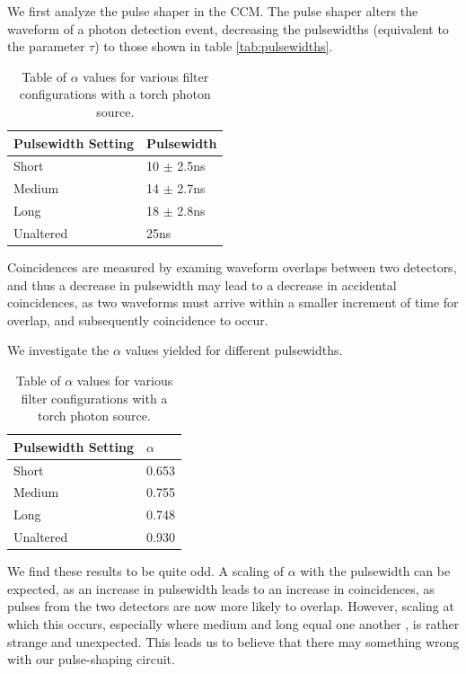 \documentclass[letterpaper, 11 pt]{article}
\begin{document}
We first analyze the pulse shaper in the CCM. The pulse shaper alters the waveform of a
photon detection event, decreasing the pulsewidths (equivalent to the parameter $\tau$) to those shown in table \ref{tab:pulsewidths}.
\begin{table}[H]
    \centering
    \begin{tabular}{|l|l|}
    \hline
    \textbf{Pulsewidth Setting} & \textbf{Pulsewidth} \\ \hline
    Short        & 10 $\pm$ 2.5ns                   \\ \hline
    Medium        & 14 $\pm$ 2.7ns                   \\ \hline
    Long        & 18 $\pm$ 2.8ns                   \\ \hline
    Unaltered                  & 25ns                   \\ \hline
    \end{tabular}
    \caption{Table of $\alpha$ values for various filter configurations with a torch photon source.}
\end{table}\label{tab:pulsewidths}
Coincidences are measured by examing waveform overlaps between two
detectors, and thus a decrease in pulsewidth may lead to a decrease in accidental coincidences,
as two waveforms must arrive within a smaller increment of time for overlap,
and subsequently coincidence to occur.

We investigate the $\alpha$ values yielded for different pulsewidths.
\begin{table}[H]
    \centering
    \begin{tabular}{|l|l|}
    \hline
    \textbf{Pulsewidth Setting} & \textbf{$\alpha$} \\ \hline
    Short        & 0.653                   \\ \hline
    Medium        & 0.755                   \\ \hline
    Long        & 0.748                   \\ \hline
    Unaltered                  & 0.930                   \\ \hline
    \end{tabular}
    \caption{Table of $\alpha$ values for various filter configurations with a torch photon source.}
\end{table}\label{tab:pulsewidths}
We find these results to be quite odd. A scaling of $\alpha$ with the pulsewidth can be expected,
as an increase in pulsewidth leads to an increase in coincidences, as pulses from the two detectors are now
more likely to overlap. However, scaling at which this occurs, especially where medium and long equal one another
, is rather strange and unexpected. This leads us to believe that there may something wrong with our pulse-shaping circuit.
\end{document}
